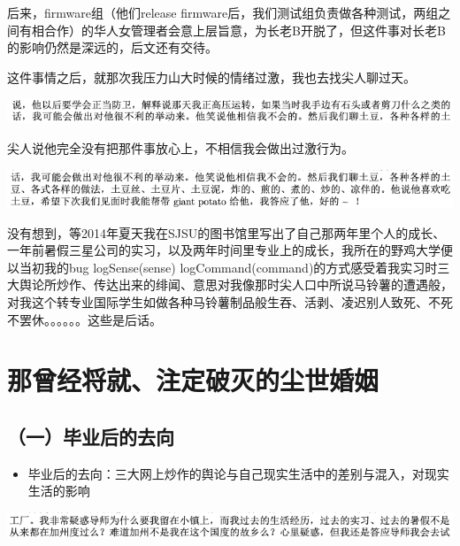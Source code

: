 \documentclass[9pt, b5paper]{article}
\begin{document}
后来，firmware组（他们release firmware后，我们测试组负责做各种测试，两组之间有相合作）的华人女管理者会意上层旨意，为长老B开脱了，但这件事对长老B的影响仍然是深远的，后文还有交待。

这件事情之后，就那次我压力山大时候的情绪过激，我也去找尖人聊过天。

\begin{center}
\includegraphics[width=.9\linewidth]{./pic/readme_20210507_172332.png}
\end{center}

尖人说他完全没有把那件事放心上，不相信我会做出过激行为。

\begin{center}
\includegraphics[width=.9\linewidth]{./pic/readme_20210507_172415.png}
\end{center}

没有想到，等2014年夏天我在SJSU的图书馆里写出了自己那两年里个人的成长、一年前暑假三星公司的实习，以及两年时间里专业上的成长，我所在的野鸡大学便以当初我的bug logSense(sense) logCommand(command)的方式感受着我实习时三大舆论所炒作、传达出来的绯闻、意思对我像那时尖人口中所说马铃薯的遭遇般，对我这个转专业国际学生如做各种马铃薯制品般生吞、活剥、凌迟别人致死、不死不罢休。。。。。。这些是后话。


\section{那曾经将就、注定破灭的尘世婚姻}
\label{sec:orgfc244ec}

\subsection{（一）毕业后的去向}
\label{sec:org967a339}

\begin{itemize}
\item 毕业后的去向：三大网上炒作的舆论与自己现实生活中的差别与混入，对现实生活的影响
\end{itemize}

\begin{center}
\includegraphics[width=.9\linewidth]{./pic/backups_plans_20210426_095826.png}
\end{center}
\end{document}
